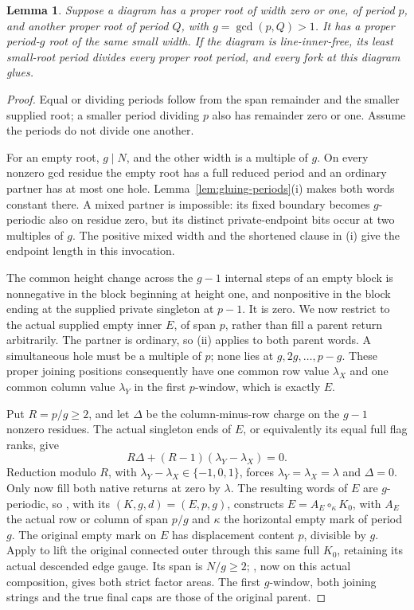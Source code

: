 \documentclass[11pt,a4paper]{amsart}
\numberwithin{equation}{section}
\theoremstyle{plain}
\newtheorem{lemma}[theorem]{Lemma}
\theoremstyle{definition}
\begin{document}
\begin{lemma}\label{lem:gluing-small}
Suppose a diagram has a proper root of width zero or one, of period \(p\), and another proper root of period \(Q\), with \(g=\gcd(p,Q)>1\).  It has a proper period-\(g\) root of the same small width.  If the diagram is line-inner-free, its least small-root period divides every proper root period, and every fork at this diagram glues.
\end{lemma}
\begin{proof}
Equal or dividing periods follow from the span remainder and the smaller supplied root; a smaller period dividing \(p\) also has remainder zero or one.  Assume the periods do not divide one another.

For an empty root, \(g\mid N\), and the other width is a multiple of \(g\).  On every nonzero gcd residue the empty root has a full reduced period and an ordinary partner has at most one hole.  Lemma~\ref{lem:gluing-periods}(i) makes both words constant there.  A mixed partner is impossible: its fixed boundary becomes \(g\)-periodic also on residue zero, but its distinct private-endpoint bits occur at two multiples of \(g\).  The positive mixed width and the shortened clause in (i) give the endpoint length in this invocation.

The common height change across the \(g-1\) internal steps of an empty block is nonnegative in the block beginning at height one, and nonpositive in the block ending at the supplied private singleton at \(p-1\).  It is zero.  We now restrict to the actual supplied empty inner \(E\), of span \(p\), rather than fill a parent return arbitrarily.  The partner is ordinary, so (ii) applies to both parent words.  A simultaneous hole must be a multiple of \(p\); none lies at \(g,2g,\ldots,p-g\).  These proper joining positions consequently have one common row value \(\lambda_X\) and one common column value \(\lambda_Y\) in the first \(p\)-window, which is exactly \(E\).

Put \(R=p/g\ge2\), and let \(\Delta\) be the column-minus-row
charge on the \(g-1\) nonzero residues.  The actual singleton ends
of \(E\), or equivalently its equal full flag ranks, give
\[
 R\Delta+(R-1)(\lambda_Y-\lambda_X)=0.
\]
Reduction modulo \(R\), with
\(\lambda_Y-\lambda_X\in\{-1,0,1\}\), forces
\(\lambda_Y=\lambda_X=\lambda\) and \(\Delta=0\).
Only now fill both native returns at zero by \(\lambda\).
The resulting words of \(E\) are \(g\)-periodic, so
, with its \((K,g,d)=(E,p,g)\),
constructs \(E=A_E\circ_\kappa K_0\), with \(A_E\) the actual
row or column of span \(p/g\) and \(\kappa\) the horizontal empty
mark of period \(g\).  The original empty mark on \(E\) has
displacement content \(p\), divisible by \(g\).  Apply
 to lift the original connected outer
through this same full \(K_0\), retaining its actual descended
edge gauge.  Its span is \(N/g\ge2\); , now
on this actual composition, gives both strict factor areas.
The first \(g\)-window, both joining strings and the true final
caps are those of the original parent.


\end{proof}
\end{document}
